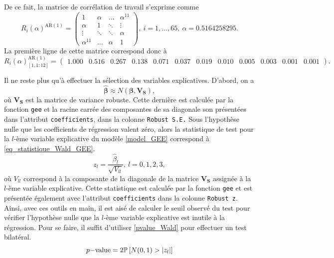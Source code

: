 \documentclass{article}
\begin{document}
	De ce fait, la matrice de corrélation de travail s'exprime comme
	\begin{equation}
		R_i(\alpha)^{\mathrm{AR(1)}} =
		\begin{pmatrix}
			1 		     & \alpha 		 & \dots  & \alpha^{11} \\
			\alpha       & 1 	  	 	 & \ddots & \vdots \\
			\vdots       & \ddots 	 	 & \ddots & \alpha \\
			\alpha^{11} & \dots  & \alpha    & 1
		\end{pmatrix},\
	i=1,\dots,65,\ \alpha=0.5164258295.
	\end{equation}
	La première ligne de cette matrice correspond donc à
	\setcounter{MaxMatrixCols}{20}
	$$
	R_i(\alpha)_{[1, 1:12]}^{\mathrm{AR(1)}} = 
	\begin{pmatrix}	
		1.000 & 0.516 & 0.267 & 0.138 & 0.071 & 0.037 & 0.019 & 0.010 & 0.005 & 0.003 & 0.001 & 0.001
	\end{pmatrix}
	.$$
	
	Il ne reste plus qu'à effectuer la sélection des variables explicatives. D'abord, on a
	\begin{equation}
		\hat{\boldsymbol{\beta}} \approx N(\boldsymbol{\beta}, \boldsymbol{V_S}),
	\end{equation}
	où $\boldsymbol{V_S}$ est la matrice de variance robuste. Cette dernière est calculée par la fonction \texttt{gee} et la racine carrée des composantes de sa diagonale son présentées dans l'attribut \texttt{coefficients}, dans la colonne \texttt{Robust S.E.}
	Sous l'hypothèse nulle que les coefficients de régression valent zéro, alors la statistique de test pour la $l$-ème variable explicative du modèle \eqref{model_GEE} correspond à \eqref{eq_statistique_Wald_GEE}.
	\begin{equation}\label{eq_statistique_Wald_GEE}
		z_l = \frac{\hat{\beta}_l}{\sqrt{V_{ll}}},\ l=0,1,2,3,
	\end{equation}
	où	$V_{ll}$ correspond à la composante de la diagonale de la matrice $\boldsymbol{V_S}$ assignée à la $l$-ème variable explicative. Cette statistique est calculée par la fonction \texttt{gee} et est présentée également avec l'attribut \texttt{coefficients} dans la colonne \texttt{Robust z}. Ainsi, avec ces outils en main, il est aisé de calculer le seuil observé du test pour vérifier l'hypothèse nulle que la $l$-ème variable explicative est inutile à la régression. Pour se faire, il suffit d'utiliser \eqref{pvalue_Wald} pour effectuer un test bilatéral.
	\begin{equation}\label{pvalue_Wald}
		p\mathrm{-value} = 2\P\left[N(0,1)>|z_l|\right]
	\end{equation}
	
\end{document}
